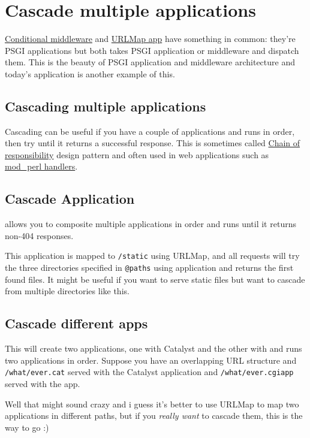 \chapter{Cascade multiple applications}
\label{day-19-cascade-multiple-applications}

\href{http://advent.plackperl.org/2009/12/day-18-load-middleware-conditionally.html}{Conditional
middleware} and
\href{http://advent.plackperl.org/2009/12/day-12-maps-multiple-apps-with-mount-and-urlmap.html}{URLMap
app} have something in common: they're PSGI applications but both takes
PSGI application or middleware and dispatch them. This is the beauty of
PSGI application and middleware architecture and today's application is
another example of this.

\section{Cascading multiple
applications}\label{cascading-multiple-applications}

Cascading can be useful if you have a couple of applications and runs in
order, then try until it returns a successful response. This is
sometimes called
\href{http://en.wikipedia.org/wiki/Chain-of-responsibility_pattern}{Chain
of responsibility} design pattern and often used in web applications
such as
\href{http://perl.apache.org/docs/2.0/user/handlers/intro.html}{mod\_perl
handlers}.

\section{Cascade Application}\label{cascade-application}

 allows you to composite multiple applications in
order and runs until it returns non-404 responses.


This application is mapped to \lstinline!/static! using URLMap, and all
requests will try the three directories specified in \lstinline!@paths!
using  application and returns the first found files. It might
be useful if you want to serve static files but want to cascade from
multiple directories like this.

\section{Cascade different apps}\label{cascade-different-apps}


This will create two applications, one with Catalyst and the other with
 and runs two applications in order. Suppose you have an
overlapping URL structure and \lstinline!/what/ever.cat! served with the
Catalyst application and \lstinline!/what/ever.cgiapp! served with the
 app.

Well that might sound crazy and i guess it's better to use URLMap to map
two applications in different paths, but if you \emph{really want} to
cascade them, this is the way to go :)

